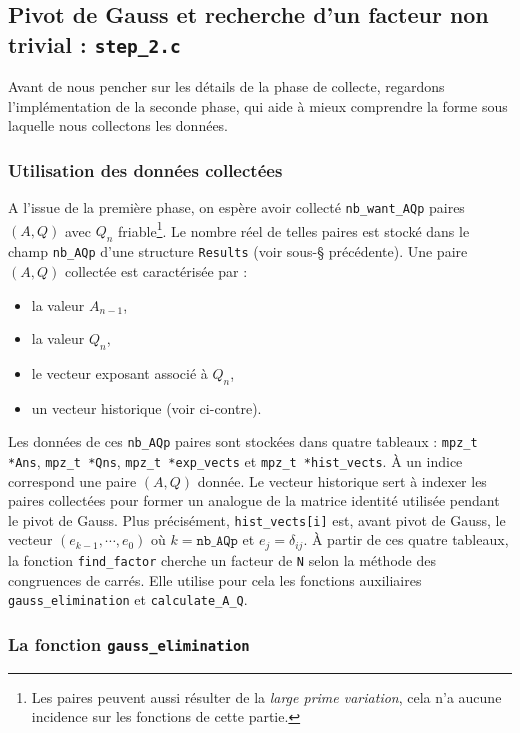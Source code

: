 \subsection{Pivot de Gauss et recherche d'un facteur non trivial :
\texttt{step\_2.c}}

Avant de nous pencher sur les détails de la phase de collecte, regardons 
l'implémentation de la seconde phase, qui aide à mieux comprendre la 
forme sous laquelle nous collectons les données.

\subsubsection{Utilisation des données collectées}

A l'issue de la première phase, on espère avoir collecté \texttt{nb\_want\_AQp}
paires $(A,Q)$ avec $Q_n$ friable\footnote{Les paires peuvent aussi résulter de
la \textit{large prime variation}, cela n'a aucune incidence sur les fonctions
de cette partie.}. Le nombre réel de telles paires est stocké dans le champ
\texttt{nb\_AQp} d'une structure \texttt{Results} (voir sous-§ précédente). Une
paire $(A,Q)$ collectée est caractérisée par :

\begin{itemize}
    \item la valeur $A_{n-1}$,
    \item la valeur $Q_n$,
    \item le vecteur exposant associé à $Q_n$,
    \item un vecteur historique (voir ci-contre).
\end{itemize}

Les données de ces \texttt{nb\_AQp} paires sont stockées dans quatre tableaux :
\texttt{mpz\_t *Ans}, \texttt{mpz\_t *Qns}, \texttt{mpz\_t *exp\_vects} et
\texttt{mpz\_t *hist\_vects}. À un indice correspond une paire $(A,Q)$ donnée.
Le vecteur historique sert à indexer les paires collectées pour former un
analogue de la matrice identité utilisée pendant le pivot de Gauss. Plus
précisément, \texttt{hist\_vects[i]} est, avant pivot de Gauss, le vecteur
$(e_{k-1}, \cdots, e_0)$ où $k=\texttt{nb\_AQp}$ et $e_j = \delta_{ij}$. À
partir de ces quatre tableaux, la fonction \texttt{find\_factor} cherche un
facteur de \texttt{N} selon la méthode des congruences de carrés. Elle utilise
pour cela les fonctions auxiliaires \texttt{gauss\_elimination} et
\texttt{calculate\_A\_Q}. 

\subsubsection{La fonction \texttt{gauss\_elimination}}

